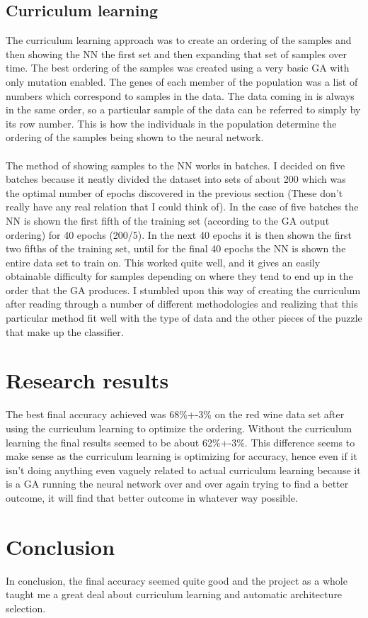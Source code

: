 \documentclass[conference]{IEEEtran}
\begin{document}
\subsection{Curriculum learning}
The curriculum learning approach was to create an ordering of the samples and then showing the NN the first set and then expanding that set of samples over time. The best ordering of the samples was created using a very basic GA with only mutation enabled. The genes of each member of the population was a list of numbers which correspond to samples in the data. The data coming in is always in the same order, so a particular sample of the data can be referred to simply by its row number. This is how the individuals in the population determine the ordering of the samples being shown to the neural network.
\\\\
The method of showing samples to the NN works in batches. I decided on five batches because it neatly divided the dataset into sets of about 200 which was the optimal number of epochs discovered in the previous section (These don't really have any real relation that I could think of). In the case of five batches the NN is shown the first fifth of the training set (according to the GA output ordering) for 40 epochs (200/5). In the next 40 epochs it is then shown the first two fifths of the training set, until for the final 40 epochs the NN is shown the entire data set to train on.
This worked quite well, and it gives an easily obtainable difficulty for samples depending on where they tend to end up in the order that the GA produces. I stumbled upon this way of creating the curriculum after reading through a number of different methodologies and realizing that this particular method fit well with the type of data and the other pieces of the puzzle that make up the classifier. 

\section{Research results}
The best final accuracy achieved was 68\%+-3\% on the red wine data set after using the curriculum learning to optimize the ordering. Without the curriculum learning the final results seemed to be about 62\%+-3\%. This difference seems to make sense as the curriculum learning is optimizing for accuracy, hence even if it isn't doing anything even vaguely related to actual curriculum learning because it is a GA running the neural network over and over again trying to find a better outcome, it will find that better outcome in whatever way possible.

\section{Conclusion}
In conclusion, the final accuracy seemed quite good and the project as a whole taught me a great deal about curriculum learning and automatic architecture selection.




\vspace{12pt}
\end{document}
